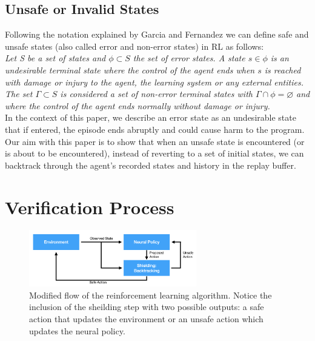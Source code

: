 \documentclass[acmsmall,review,authorversion]{acmart}
\begin{document}
\subsection{Unsafe or Invalid States}
\label{sub:unsafe_state}
Following the notation explained by Garcia and Fernandez \cite{DBLP:journals/corr/GarciaF14} we can define safe and unsafe states (also called error and non-error states) in RL as follows: \\

\emph{Let S be a set of states and $\phi \subset S$ the set of error states. A state $s \in \phi$ is an undesirable terminal state where the control of the agent ends when $s$ is reached with damage or injury to the agent, the learning system or any external entities. The set $\Gamma \subset S$ is considered a set of non-error terminal states with $\Gamma \cap \phi = \mathbb{\varnothing}$ and where the control of the agent ends normally without damage or injury.} \\

In the context of this paper, we describe an error state as an undesirable state that if entered, the episode ends abruptly and could cause harm to the program. Our aim with this paper is to show that when an unsafe state is encountered (or is about to be encountered), instead of reverting to a set of initial states, we can backtrack through the agent's recorded states and history in the replay buffer.


\section{Verification Process}
\label{section:verification}

    \begin{figure}[ht]
        \centering
        \includegraphics[width=0.65\textwidth]{assets/rl_flow_diagram.png}
        \caption{Modified flow of the reinforcement learning algorithm. Notice the inclusion of the sheilding step with two possible outputs: a safe action that updates the environment or an unsafe action which updates the neural policy.}
        \label{fig:sheilding_flow}
    \end{figure}
    
\end{document}

